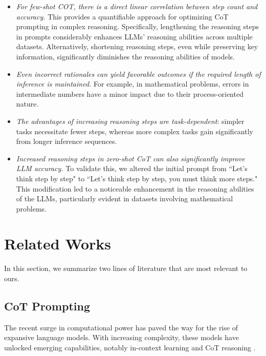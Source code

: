 \documentclass[11pt]{article}
\begin{document}
\begin{itemize}[leftmargin=*]\setlength\itemsep{-0.3em}

\item \emph{For few-shot COT, there is a direct linear correlation between step count and accuracy.} This provides a quantifiable approach for optimizing CoT prompting in complex reasoning. Specifically, lengthening the reasoning steps in prompts considerably enhances LLMs' reasoning abilities across multiple datasets. Alternatively, shortening reasoning steps, even while preserving key information, significantly diminishes the reasoning abilities of models.
%
\item \emph{Even incorrect rationales can yield favorable outcomes if the required length of inference is maintained.} For example, in mathematical problems, errors in intermediate numbers have a minor impact due to their process-oriented nature.

\item \emph{The advantages of increasing reasoning steps are task-dependent}: simpler tasks necessitate fewer steps, whereas more complex tasks gain significantly from longer inference sequences.

\item \emph{Increased reasoning steps in zero-shot CoT can also significantly improve LLM accuracy.} To validate this, we altered the initial prompt from ``Let's think step by step" to ``Let's think step by step, you must think more steps." This modification led to a noticeable enhancement in the reasoning abilities of the LLMs, particularly evident in datasets involving mathematical problems.

\end{itemize}
\section{Related Works}
In this section, we summarize two lines of literature that are most relevant to ours.

\subsection{CoT Prompting}
The recent surge in computational power has paved the way for the rise of expansive language models. With increasing complexity, these models have unlocked emerging capabilities, notably in-context learning and CoT reasoning \cite{wei2022chain,brown2020language,schaeffer2023emergent}.
\end{document}
